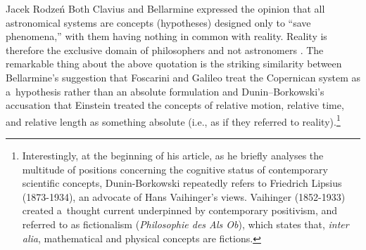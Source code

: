 \begin{artengenv}{Jacek Rodzeń}
Both Clavius and Bellarmine expressed the opinion that all astronomical systems are concepts (hypotheses) designed only to ``save phenomena,'' with them having nothing in common with reality. Reality is therefore the exclusive domain of philosophers and not astronomers
\parencite[][p.158]{numbers_catholicism_1986}. %
 The remarkable thing about the above quotation is the striking similarity between Bellarmine's suggestion that Foscarini and Galileo treat the Copernican system as a~hypothesis rather than an absolute formulation and Dunin–Borkowski's accusation that Einstein treated the concepts of relative motion, relative time, and relative length as something absolute (i.e., as if they referred to reality).\footnote{Interestingly, at the beginning of his article, as he briefly analyses the multitude of positions concerning the cognitive status of contemporary scientific concepts, Dunin-Borkowski repeatedly refers to Friedrich Lipsius (1873-1934), an advocate of Hans Vaihinger's views. Vaihinger (1852-1933) created a~thought current underpinned by contemporary positivism, and referred to as fictionalism (\textit{Philosophie des Als Ob}), which states that, \textit{inter alia}, mathematical and physical concepts are fictions.}


\end{artengenv}
